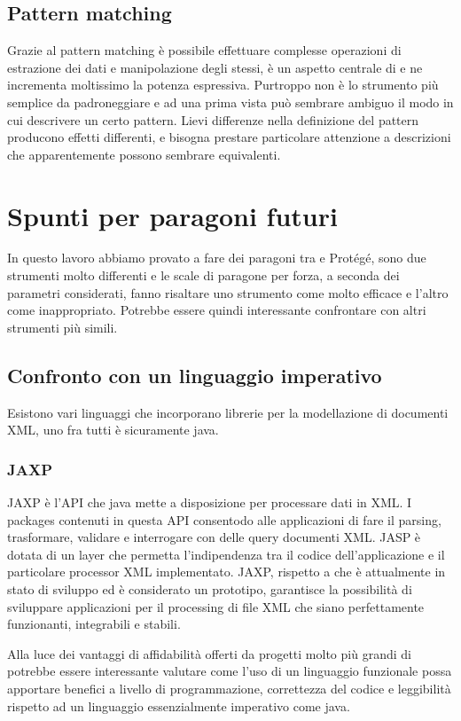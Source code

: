 \subsection{Pattern matching}
Grazie al pattern matching è possibile effettuare complesse operazioni di estrazione dei dati e manipolazione degli stessi, è un aspetto centrale di \cduce e ne incrementa moltissimo la potenza espressiva. Purtroppo non è lo strumento più semplice da padroneggiare e ad una prima vista può sembrare ambiguo il modo in cui descrivere un certo pattern. Lievi differenze nella definizione del pattern producono effetti differenti, e bisogna prestare particolare attenzione a descrizioni che apparentemente possono sembrare equivalenti.
\section{Spunti per paragoni futuri}
In questo lavoro abbiamo provato a fare dei paragoni tra \cduce e Protégé, sono due strumenti molto differenti e le scale di paragone per forza, a seconda dei parametri considerati, fanno risaltare uno strumento come molto efficace e l'altro come inappropriato. Potrebbe essere quindi interessante confrontare \cduce con altri strumenti più simili.
\subsection{Confronto con un linguaggio imperativo}
Esistono vari linguaggi che incorporano librerie per la modellazione di documenti XML, uno fra tutti è sicuramente java.
\subsubsection{JAXP}
JAXP\cite{JAXP} è l'API che java mette a disposizione per processare dati in XML. I packages contenuti in questa API consentodo alle applicazioni di fare il parsing, trasformare, validare e interrogare con delle query documenti XML. JASP è dotata di un layer che permetta l'indipendenza tra il codice dell'applicazione e il particolare processor XML implementato. JAXP, rispetto a \cduce che è attualmente in stato di sviluppo ed è considerato un prototipo, garantisce la possibilità di sviluppare applicazioni per il processing di file XML che siano perfettamente funzionanti, integrabili e stabili.

Alla luce dei vantaggi di affidabilità offerti da progetti molto più grandi di \cduce potrebbe essere interessante valutare come l'uso di un linguaggio funzionale possa apportare benefici a livello di programmazione, correttezza del codice e leggibilità rispetto ad un linguaggio essenzialmente imperativo come java.
